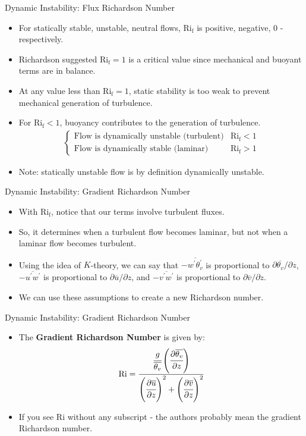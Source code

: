 \begin{frame}{Dynamic Instability: Flux Richardson Number}
\begin{itemize}
	\item For statically stable, unstable, neutral flows, $\mathrm{Ri_f}$ is positive, negative, 0 - respectively.
	\item Richardson suggested $\mathrm{Ri_f}=1$ is a critical value since mechanical and buoyant terms are in balance.
	\item At any value less than $\mathrm{Ri_f}=1$, static stability is too weak to prevent mechanical generation of turbulence.
	\item For $\mathrm{Ri_f}<1$, buoyancy contributes to the generation of turbulence.
	\begin{gather*}
	\begin{cases}
	\text{Flow is dynamically unstable (turbulent)} & \mathrm{Ri_f}<1\\
	\text{Flow is dynamically stable (laminar)} & \mathrm{Ri_f}>1
	\end{cases}
	\end{gather*}
	\item Note: statically unstable flow is by definition dynamically unstable.
\end{itemize}
\end{frame}
\begin{frame}{Dynamic Instability: Gradient Richardson Number}
\begin{itemize}
	\item With $\mathrm{Ri_f}$, notice that our terms involve turbulent fluxes.
	\item So, it determines when a turbulent flow becomes laminar, but not when a laminar flow becomes turbulent.
	\item Using the idea of $K$-theory, we can say that $-\overline{w^\prime \theta_v^\prime}$ is proportional to $\partial \overline{\theta_v}/\partial z$,$-\overline{u^\prime w^\prime}$ is proportional to $\partial \overline{u}/\partial z$, and $-\overline{v^\prime w^\prime}$ is proportional to $\partial \overline{v}/\partial z$.
	\item We can use these assumptions to create a new Richardson number.
\end{itemize}
\end{frame}
\begin{frame}{Dynamic Instability: Gradient Richardson Number}
\begin{itemize}
	\item The \textbf{Gradient Richardson Number} is given by:
	$$\mathrm{Ri} = \frac{\cfrac{g}{\overline{\theta_v}} \left(\cfrac{\partial \overline{\theta_v}}{\partial z}\right)}{\left(\cfrac{\partial \overline{u}}{\partial z}\right)^2 + \left(\cfrac{\partial \overline{v}}{\partial z}\right)^2}$$
	\item If you see $\mathrm{Ri}$ without any subscript - the authors probably mean the gradient Richardson number.
\end{itemize}
\end{frame}
